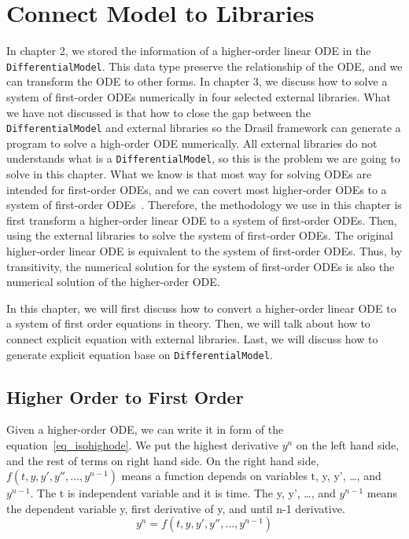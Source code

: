 \chapter{Connect Model to Libraries}
In chapter 2, we stored the information of a higher-order linear ODE in the \verb|DifferentialModel|. This data type preserve the relationship of the ODE, and we can transform the ODE to other forms. In chapter 3, we discuss how to solve a system of first-order ODEs numerically in four selected external libraries. What we have not discussed is that how to close the gap between the \verb|DifferentialModel| and external libraries so the Drasil framework can generate a program to solve a high-order ODE numerically. All external libraries do not understands what is a \verb|DifferentialModel|, so this is the problem we are going to solve in this chapter. What we know is that most way for solving ODEs are intended for first-order ODEs, and we can covert most higher-order ODEs to a system of first-order ODEs~\citep{converthigherode}. Therefore, the methodology we use in this chapter is first transform a higher-order linear ODE to a system of first-order ODEs. Then, using the external libraries to solve the system of first-order ODEs. The original higher-order linear ODE is equivalent to the system of first-order ODEs. Thus, by transitivity, the numerical solution for the system of first-order ODEs is also the numerical solution of the higher-order ODE.

In this chapter, we will first discuss how to convert a higher-order linear ODE to a system of first order equations in theory. Then, we will talk about how to connect explicit equation with external libraries. Last, we will discuss how to generate explicit equation base on \verb|DifferentialModel|.

\section{Higher Order to First Order}
\label{se_hightofirst}
Given a higher-order ODE, we can write it in form of the equation~\ref{eq_isohighode}. We put the highest derivative $y^n$ on the left hand side, and the rest of terms on right hand side. On the right hand side, $f (t, y, y', y'', \dots, y^{n-1})$ means a function depends on variables t, y, y', \dots, and $y^{n-1}$. The t is independent variable and it is time. The y, y', \dots, and $y^{n-1}$ means the dependent variable y, first derivative of y, and until n-1 derivative.
\begin{equation} \label{eq_isohighode}
  y^n = f (t, y, y', y'', \dots, y^{n-1})
\end{equation}

